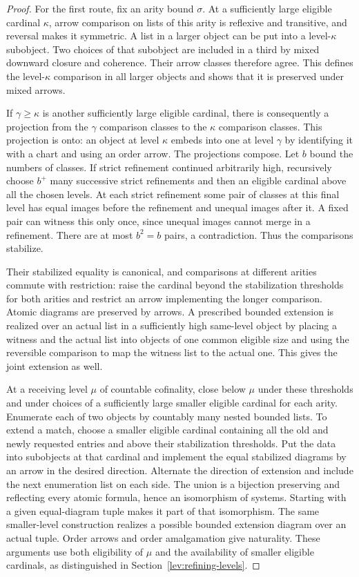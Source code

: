 \begin{proof}
For the first route, fix an arity bound $\sigma$.  At a sufficiently
large eligible cardinal $\kappa$, arrow comparison on lists of this
arity is reflexive and transitive, and reversal makes it symmetric.
A list in a larger object can be put into a level-$\kappa$ subobject.
Two choices of that subobject are included in a third by mixed
downward closure and coherence.  Their arrow classes therefore agree.
This defines the level-$\kappa$ comparison in all larger objects and
shows that it is preserved under mixed arrows.

If $\gamma\geq\kappa$ is another sufficiently large eligible cardinal,
there is consequently a projection from the $\gamma$ comparison
classes to the $\kappa$ comparison classes.  This projection is onto:
an object at level $\kappa$ embeds into one at level $\gamma$ by
identifying it with a chart and using an order arrow.  The projections
compose.  Let $b$ bound the numbers of classes.  If strict refinement
continued arbitrarily high, recursively choose $b^+$ many successive
strict refinements and then an eligible cardinal above all the
chosen levels.  At each strict refinement some pair of classes at
this final level has equal images before the refinement and unequal
images after it.  A fixed pair can witness this only once, since
unequal images cannot merge in a refinement.  There are at most
$b^2=b$ pairs, a contradiction.  Thus the comparisons stabilize.

Their stabilized equality is canonical, and comparisons at different
arities commute with restriction: raise the cardinal beyond the
stabilization thresholds for both arities and restrict an arrow
implementing the longer comparison.  Atomic diagrams are preserved
by arrows.  A prescribed bounded extension is realized over an actual
list in a sufficiently high same-level object by placing a witness
and the actual list into objects of one common eligible size and
using the reversible comparison to map the witness list to the actual
one.  This gives the joint extension as well.

At a receiving level $\mu$ of countable cofinality, close below $\mu$
under these thresholds and under choices of a sufficiently large
smaller eligible cardinal for each arity.  Enumerate each of two
objects by countably many nested bounded lists.  To extend a match,
choose a smaller eligible cardinal containing all the old and newly
requested entries and above their stabilization thresholds.  Put the
data into subobjects at that cardinal and implement the equal
stabilized diagrams by an arrow in the desired direction.  Alternate
the direction of extension and include the next enumeration list on
each side.  The union is a bijection preserving and reflecting every
atomic formula, hence an isomorphism of systems.  Starting with a
given equal-diagram tuple makes it part of that isomorphism.  The
same smaller-level construction realizes a possible bounded extension
diagram over an actual tuple.  Order arrows and order amalgamation
give naturality.  These arguments use both eligibility of $\mu$ and
the availability of smaller eligible cardinals, as distinguished in
Section~\ref{lev:refining-levels}.


\end{proof}
